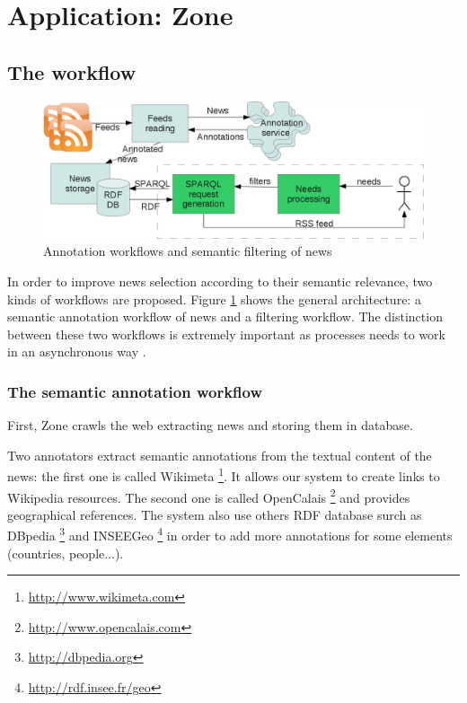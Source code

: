 \documentclass{llncs}
\begin{document}
%
\section{Application: Zone}


\subsection{The workflow}
%
\begin{figure}[htb!]
	\begin{centering}
	\includegraphics[width=1\textwidth]{diagram.png}
	\caption{Annotation workflows and semantic filtering of news}
	\label{fig:WF}
	\end{centering}
\end{figure}

In order to improve news selection according to their semantic relevance, two kinds of workflows are proposed. Figure \ref{fig:WF} shows the general architecture: a semantic annotation workflow of news and a filtering workflow. The distinction between these two workflows is extremely important as processes needs to work in an asynchronous way \cite{desclaux:urli}.

\subsubsection{The semantic annotation workflow}
First, Zone crawls the web extracting news and storing them in database.

Two annotators extract semantic annotations from the textual content of the news: the first one is called Wikimeta \footnote{\url{http://www.wikimeta.com}}. It allows our system to create links to Wikipedia resources. The second one is called OpenCalais \footnote{\url{http://www.opencalais.com}} and provides geographical references.
The system also use others RDF database surch as DBpedia \footnote{\url{http://dbpedia.org}} and INSEEGeo \footnote{\url{http://rdf.insee.fr/geo}} in order to add more annotations for some elements (countries, people...).
\end{document}
